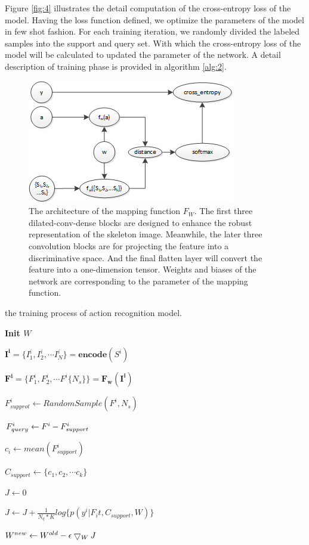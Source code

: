 \documentclass{bmvc2k}
\begin{document}
Figure \ref{fig:4} illustrates the detail computation of the cross-entropy loss of the model. Having the loss function defined, we optimize the parameters of the model in few shot fashion. For each training iteration, we randomly divided the labeled samples into the support and query set. With which the cross-entropy loss of the model will be calculated to updated the parameter of the network. A detail description of training phase is provided in algorithm \ref{alg:2}.

\begin{figure}[htb] 
	\centering
	\includegraphics[scale=1]{images/Figure_5.png}
	\caption{The architecture of the mapping function $F_W$. The first three dilated-conv-dense blocks are designed to enhance the robust representation of the skeleton image. Meanwhile, the later three convolution blocks are for projecting the feature into a discriminative space. And the final flatten layer will convert the feature into a one-dimension tensor. Weights and biases of the network are corresponding to the parameter of the mapping function.}
	\label{fig:5}	
\end{figure}

\begin{algorithm}[htb]
	\caption{the training process of action recognition model.}
	\label{alg:2}
	\bf{Init $W$}

	
	\Repeat{}
	{
		{
			$\mathbf{I^i}=\{I^i_1,I^i_2,\cdots I^i_N\}=\mathbf{encode}(S^i)$
			
			$\mathbf{F^i}=\{F^i_1,F^i_2,\cdots F^i \{ N_s \} \}=\mathbf{F_w(I^i)}$
		}	
		{
			$F^i_{supprot}\leftarrow RandomSample(F^i,N_s)$
			
			$F^i_{query}\leftarrow F^i\-- F^i_{support}$
			
			$c_i\leftarrow mean(F^i_{support})$
		}
		$C_{support}\leftarrow \{c_1,c_2,\cdots c_k\}$
		
		$J\leftarrow0$
		
		{
			{
				
				$J\leftarrow J+ \frac{1}{N_q*K}log\{p(y^i|F_it,C_{support},W)\}$
			}	
		}
		$W^{new}\leftarrow W^{old}\-- \epsilon\bigtriangledown_W J$
	}
\end{algorithm}
\end{document}
